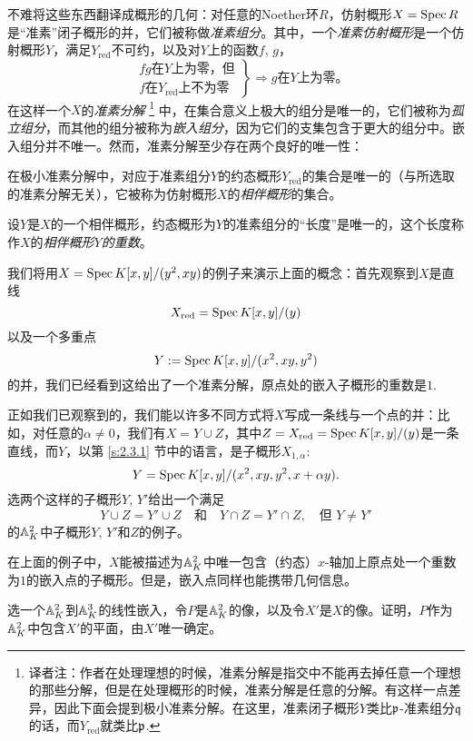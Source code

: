 不难将这些东西翻译成概形的几何：对任意的Noether环$R$，仿射概形$X=\operatorname{Spec} R$是“准素”闭子概形的并，它们被称做\textit{准素组分}。其中，一个\textit{准素仿射概形}是一个仿射概形$Y$，满足$Y_{\text{red}}$不可约，以及对$Y$上的函数$f$, $g$，
\[
	\left. 
		\begin{aligned}
			&\text{$fg$在$Y$上为零，但}\\
			&\text{$f$在$Y_{\text{red}}$上不为零}
		\end{aligned}
	\right\} \Rightarrow \text{$g$在$Y$上为零。}
\]
在这样一个$X$的\textit{准素分解}
\footnote{译者注：作者在处理理想的时候，准素分解是指交中不能再去掉任意一个理想的那些分解，但是在处理概形的时候，准素分解是任意的分解。有这样一点差异，因此下面会提到极小准素分解。在这里，准素闭子概形$Y$类比$\mathfrak{p}$-准素组分$\mathfrak{q}$的话，而$Y_{\text{red}}$就类比$\mathfrak{p}$.}
中，在集合意义上极大的组分是唯一的，它们被称为\textit{孤立组分}，而其他的组分被称为\textit{嵌入组分}，因为它们的支集包含于更大的组分中。嵌入组分并不唯一。然而，准素分解至少存在两个良好的唯一性：
\begin{compactenum}[(1)]
\item 在极小准素分解中，对应于准素组分$Y$的约态概形$Y_{\text{red}}$的集合是唯一的（与所选取的准素分解无关），它被称为仿射概形$X$的\textit{相伴概形}的集合。
\item 设$Y$是$X$的一个相伴概形，约态概形为$Y$的准素组分的“长度”是唯一的，这个长度称作$X$的\textit{相伴概形$Y$的重数}。
\end{compactenum}

我们将用$X=\operatorname{Spec} K[x,y]/(y^2,xy)$的例子来演示上面的概念：首先观察到$X$是直线
\[
	X_{\text{red}}=\operatorname{Spec} K[x,y]/(y)
\]
以及一个多重点
\[
	Y:=\operatorname{Spec} K[x,y]/(x^2,xy,y^2)
\]
的并，我们已经看到这给出了一个准素分解，原点处的嵌入子概形的重数是$1$.

正如我们已观察到的，我们能以许多不同方式将$X$写成一条线与一个点的并：比如，对任意的$\alpha\neq 0$，我们有$X=Y\cup Z$，其中$Z=X_{\text{red}}=\operatorname{Spec} K[x,y]/(y)$是一条直线，而$Y$，以第 \ref{s:2.3.1} 节中的语言，是子概形$X_{1,\alpha}$:
\[
	Y=\operatorname{Spec} K[x,y]/(x^2,xy,y^2,x+\alpha y).
\]
选两个这样的子概形$Y$, $Y'$给出一个满足
\[
	Y\cup Z=Y'\cup Z\quad \text{和}\quad Y\cap Z=Y'\cap Z,\quad \text{但}\,\,Y\neq Y'
\]\label{p:69}
的$\mathbb{A}_K^2$中子概形$Y$, $Y'$和$Z$的例子。

在上面的例子中，$X$能被描述为$\mathbb{A}_K^2$中唯一包含（约态）$x$-轴加上原点处一个重数为$1$的嵌入点的子概形。但是，嵌入点同样也能携带几何信息。

\begin{exe}
	选一个$\mathbb{A}_K^2$到$\mathbb{A}^3_K$的线性嵌入，令$P$是$\mathbb{A}_K^2$的像，以及令$X'$是$X$的像。证明，$P$作为$\mathbb{A}_K^2$中包含$X'$的平面，由$X'$唯一确定。
\end{exe}

